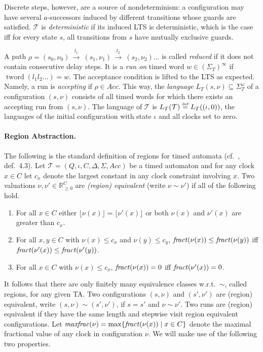 \documentclass[10pt,a4paper]{amsart}
\theoremstyle{definition}
\numberwithin{equation}{section}
\newcommand{\nnreals}{{\mathbb R}_{\geq 0}}
\newcommand{\eqby}[2][=]{\stackrel{\text{{\tiny{#2}}}}{#1}}
\newcommand{\eqdef}{\eqby{def}}
\newcommand{\fractof}[1]{{\it fract}(#1)} %
\newcommand{\maxfractof}[1]{{\it maxfrac}(#1)}
\newcommand{\floor}[1]{\lfloor#1\rfloor}
\newcommand{\T}{\mathcal{T}}
\newcommand{\states}{Q}
\newcommand{\transitions}{\Delta}
\newcommand{\clocks}{C}
\newcommand{\acc}{\mathit{Acc}}
\newcommand{\lang}{L_T}  %
\newcommand{\TAtuple}{(\states,\iota,\clocks,\transitions,\Sigma,\acc)}
\newcommand{\tword}[1]{\mathop{tword}(#1)}
\newcommand{\step}[2][]{\Step{#2}{}{#1}}
\newcommand{\Step}[3]{\ensuremath{\,{\stackrel{#1}{\longrightarrow}}{}^{\scriptstyle{#2}}_{\scriptstyle{#3}}}\,}
\newcommand{\req}{\sim}
\newcommand{\cmax}[1]{c_{#1}}
\newcommand{\mypar}[1]{\paragraph*{#1.}}
\begin{document}
Discrete steps, however, are a source of nondeterminism: 
a configuration may have several $a$-successors
induced by different transitions whose guards are satisfied.
$\T$ is \emph{deterministic} if its induced LTS is deterministic, which is the case iff for every state $s$, all transitions from $s$ have mutually exclusive guards.

A path
$\rho=
(s_0,\nu_0)
\step{l_1}
(s_1,\nu_1)
\step{l_2}
(s_2,\nu_2)
\ldots
$
is called \emph{reduced} if it does not contain consecutive delay steps.
It is a \emph{run on} timed word
$w
\in (\Sigma_T)^\infty$
if
$\tword{l_1l_2\ldots}=w$.
The acceptance condition is lifted to the LTS as expected. Namely,
a run is \emph{accepting}
if $\rho\in\acc$.
This way,
the \emph{language} $\lang(s,\nu)\subseteq \Sigma_T^\omega$ of a configuration $(s,\nu)$
consists of all timed words for which there exists an accepting run from $(s,\nu)$.
The language of $\T$ is $\lang(\T)\eqdef\lang((\iota,0))$, the languages of the initial configuration with state $\iota$ and all clocks set to zero.


\medskip
\mypar{Region Abstraction}
The following is the standard definition of regions for timed automata (cf.~\cite{AD1994}, def.~4.3).
Let $\T=\TAtuple$ be a timed automaton and
for any clock $x\in\clocks$ let $\cmax{x}$ denote the largest constant in any clock constraint involving $x$.
Two valuations $\nu,\nu'\in \nnreals^C$ are \emph{(region) equivalent} (write $\nu\req\nu'$) if all of the following hold.
\begin{enumerate}
\item For all $x\in\clocks$ either $ \floor{\nu(x)}=\floor{\nu'(x)} $
    or both $\nu(x)$ and $\nu'(x)$ are greater than $\cmax{x}$.
\item For all $x,y\in\clocks$ with $\nu(x)\le \cmax{x}$ and $\nu(y)\le \cmax{y}$,
    $\fractof{\nu(x)}\le \fractof{\nu(y)}$
    iff
    $\fractof{\nu'(x)}\le \fractof{\nu'(y)}$.
\item For all $x\in\clocks$ with $\nu(x)\le \cmax{x}$, $\fractof{\nu(x)}=0$ iff $\fractof{\nu'(x)}=0$.
\end{enumerate}
It follows that there are only finitely many equivalence classes w.r.t.~$\req$, called regions, for any given TA. Two configurations $(s,\nu)$ and $(s',\nu')$ are (region) equivalent,
write $(s,\nu)\req(s',\nu')$, if $s=s'$ and $\nu\req\nu'$.
Two runs are (region) equivalent if they have the same length and stepwise visit region equivalent configurations.
Let $\maxfractof{\nu} = \max\{\fractof{\nu(x)} \mid x\in\clocks\}$ denote the maximal fractional value of any clock in configuration $\nu$.
We will make use of the following two properties.
\end{document}
